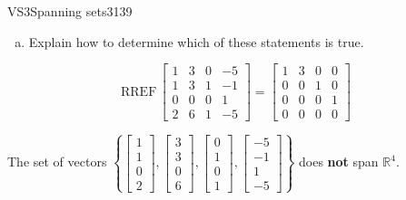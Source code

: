 \begin{exercise}{VS3}{Spanning sets}{3139}
\begin{exerciseStatement}
\begin{enumerate}[(a)]
\begin{itemize}
 
\end{itemize}

     
\item  

 Explain how to determine which of these statements is true. 

 
\end{enumerate}

     \end{exerciseStatement}
 \begin{exerciseAnswer} 

 \[
\mathrm{RREF}\, \left[\begin{array}{cccc}
1 & 3 & 0 & -5 \\
1 & 3 & 1 & -1 \\
0 & 0 & 0 & 1 \\
2 & 6 & 1 & -5
\end{array}\right] = \left[\begin{array}{cccc}
1 & 3 & 0 & 0 \\
0 & 0 & 1 & 0 \\
0 & 0 & 0 & 1 \\
0 & 0 & 0 & 0
\end{array}\right]
            \] 

 

 The set of vectors \(\left\{ \left[\begin{array}{c}
1 \\
1 \\
0 \\
2
\end{array}\right] , \left[\begin{array}{c}
3 \\
3 \\
0 \\
6
\end{array}\right] , \left[\begin{array}{c}
0 \\
1 \\
0 \\
1
\end{array}\right] , \left[\begin{array}{c}
-5 \\
-1 \\
1 \\
-5
\end{array}\right] \right\}\) does \textbf{not} span \(\mathbb{R}^4\). 

 \end{exerciseAnswer}
 \end{exercise}


